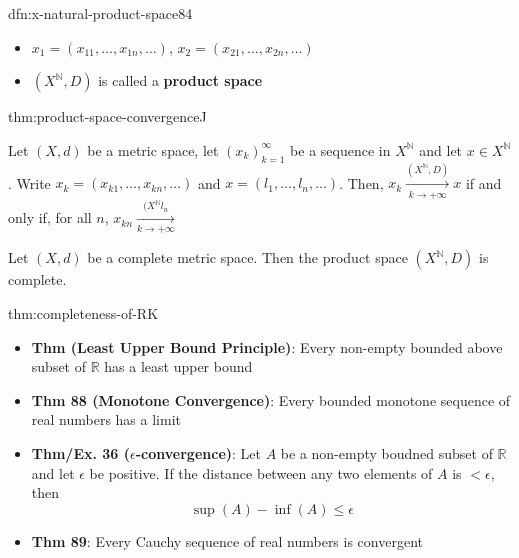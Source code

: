 \documentclass[landscape, 8pt]{extarticle}
\begin{document}
\begin{multicols}{3}
\begin{dfn}{dfn:x-natural-product-space}{84}
    \vspace{-8pt}
    \begin{itemize}[leftmargin=*]
        \item $x_{1} = (x_{11},\dots, x_{1n},\dots)$, $x_{2} = (x_{21},\dots,x_{2n},\dots)$
        \item $(X^{\mathbb{N}}, D)$ is called a \textbf{product space}
    \end{itemize}
\end{dfn}

\vspace{-5pt}
\begin{thm}{thm:product-space-convergence}{J}
    \vspace{-5pt}

    Let $(X, d)$ be a metric space, let $(x_{k})_{k=1}^{\infty}$ be a sequence in $X^{\mathbb{N}}$ and let $x\in X^{\mathbb{N}}$. Write $x_{k} = (x_{k 1},\dots, x_{kn},\dots)$ and $x = (l_{1},\dots,l_{n},\dots)$. Then, $x_{k} \xrightarrow[k \to +\infty]{(X^{\mathbb{N}}, D)} x$ if and only if, for all $n$, $x_{kn}\xrightarrow[k \to +\infty]{(X^{\mathbb{N}} l_{n}}$


    Let $(X, d)$ be a complete metric space. Then the product space $(X^{\mathbb{N}}, D)$ is complete.
\end{thm}

\vspace{-5pt}
\begin{thm}{thm:completeness-of-R}{K}
    \vspace{-5pt}
    \begin{itemize}[leftmargin=*]
        \item \textbf{Thm (Least Upper Bound Principle)}: Every non-empty bounded above subset of $\mathbb{R}$ has a least upper bound
        \item \textbf{Thm 88 (Monotone Convergence)}: Every bounded monotone sequence of real numbers has a limit
        \item \textbf{Thm/Ex. 36 ($\epsilon$-convergence)}: Let $A$ be a non-empty boudned subset of $\mathbb{R}$ and let $\epsilon$ be positive. If the distance between any two elements of $A$ is $< \epsilon$, then
        \[\sup(A) - \inf(A) \le \epsilon\]
        \vspace{-13pt}
        \item \textbf{Thm 89}: Every Cauchy sequence of real numbers is convergent
    \end{itemize}
\end{thm}


\end{multicols}
\end{document}
